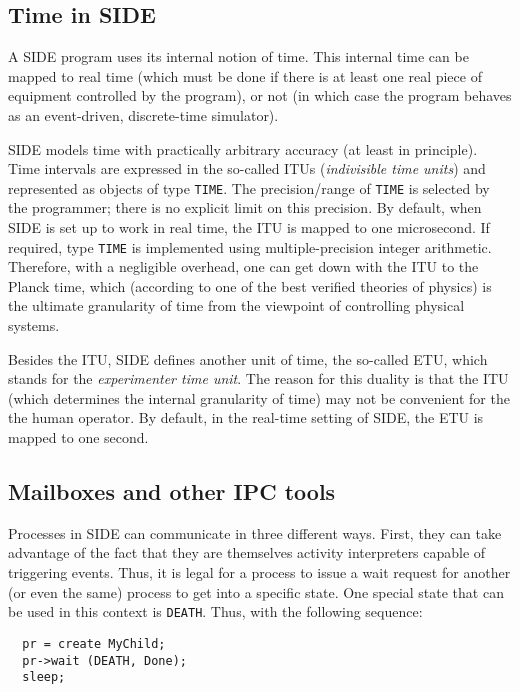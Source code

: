 \subsection{Time in SIDE}

A SIDE program uses its internal notion of time.
This internal time can be mapped to real time (which must be done if there is
at least one real piece of equipment controlled by the program), or not (in
which case the program behaves as an event-driven, discrete-time simulator).

SIDE models time with practically arbitrary accuracy (at least in principle).
Time intervals are expressed in the so-called ITUs
({\em indivisible time units\/}) and represented as objects of type {\tt TIME}.
The precision/range of {\tt TIME} is selected by the programmer;
there is no explicit limit on this precision.
By default, when SIDE is set up to work in real time, the ITU is
mapped to one microsecond.
If required, type {\tt TIME} is implemented using multiple-precision
integer arithmetic.
Therefore, with a negligible overhead, one can get down with the ITU
to the Planck time, which (according to one of the best verified theories
of physics) is the ultimate granularity of time
from the viewpoint of controlling physical systems.

Besides the ITU, SIDE defines another unit of time, the so-called
ETU, which stands for the {\em experimenter time unit}.
The reason for this duality is that the ITU (which determines the
internal granularity of time) may not be convenient for the
the human operator.
By default, in the real-time setting of SIDE, the ETU is mapped to
one second.

\subsection{Mailboxes and other IPC tools}

Processes in SIDE can communicate in three different ways.
First, they can take advantage of the fact that they are themselves activity
interpreters capable of triggering events.
Thus, it is legal for a process to issue a wait request for another (or
even the same) process to get into a specific state.
One special state that can be used in this context is {\tt DEATH}.
Thus, with the following sequence:

{\small\begin{verbatim}
  pr = create MyChild;
  pr->wait (DEATH, Done);
  sleep;
\end{verbatim}}

